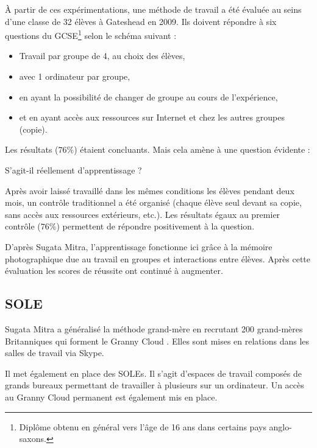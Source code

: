 À partir de ces expérimentations, une méthode de travail a été évaluée au seins d'une classe de 32 élèves à Gateshead en 2009. Ils doivent répondre à six questions du \gls{GCSE}\footnote{Diplôme obtenu en général vers l'âge de 16 ans dans certains pays anglo-saxons.} selon le schéma suivant : 

\begin{itemize}
  \item Travail par groupe de 4, au choix des élèves,
  \item avec 1 ordinateur par groupe,
  \item en ayant la possibilité de changer de groupe au cours de l'expérience,
  \item et en ayant accès aux ressources sur Internet et chez les autres groupes (copie).
\end{itemize}

Les résultats ($76\%$) étaient concluants. Mais cela amène à une question évidente : 
\begin{center}
S'agit-il réellement d'apprentissage ?
\end{center}

Après avoir laissé travaillé dans les mêmes conditions les élèves pendant deux mois, un contrôle traditionnel a été organisé (chaque élève seul devant sa copie, sans accès aux ressources extérieurs, etc.). Les résultats égaux au premier contrôle ($76\%$) permettent de répondre positivement à la question.

D'après Sugata Mitra, l'apprentissage fonctionne ici grâce à la mémoire photographique due au travail en groupes et interactions entre élèves. Après cette évaluation les scores de réussite ont continué à augmenter.


\subsection{\gls{SOLE}}
Sugata Mitra a généralisé la méthode grand-mère en recrutant 200 grand-mères Britanniques qui forment le \og Granny Cloud \fg{}. Elles sont mises en relations dans les salles de travail via Skype.

Il met également en place des SOLEs. Il s'agit d'espaces de travail composés de grands bureaux permettant de travailler à plusieurs sur un ordinateur. Un accès au \og Granny Cloud \fg{} permanent est également mis en place.

